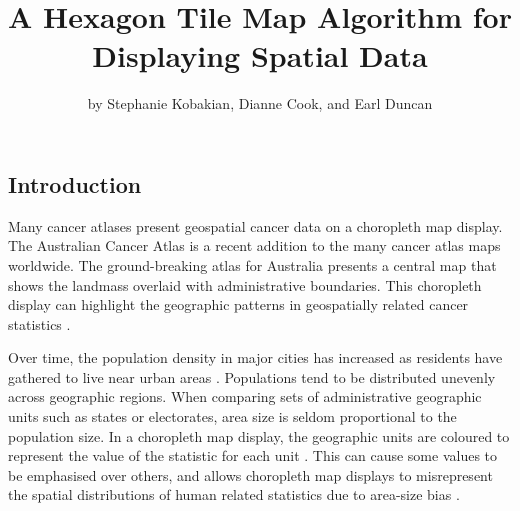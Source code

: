 \title{A Hexagon Tile Map Algorithm for Displaying Spatial Data}
\author{by Stephanie Kobakian, Dianne Cook, and Earl Duncan}

\maketitle


\hypertarget{introduction}{%
\subsection{Introduction}\label{introduction}}

Many cancer atlases present geospatial cancer data on a choropleth map
display. The Australian Cancer Atlas \citep{TACA} is a recent addition
to the many cancer atlas maps worldwide. The ground-breaking atlas for
Australia presents a central map that shows the landmass overlaid with
administrative boundaries. This choropleth display can highlight the
geographic patterns in geospatially related cancer statistics
\citep{SAMGIS}.

Over time, the population density in major cities has increased as
residents have gathered to live near urban areas \citep{ACTUC}.
Populations tend to be distributed unevenly across geographic regions.
When comparing sets of administrative geographic units such as states or
electorates, area size is seldom proportional to the population size. In
a choropleth map display, the geographic units are coloured to represent
the value of the statistic for each unit \citep{EI}. This can cause some
values to be emphasised over others, and allows choropleth map displays
to misrepresent the spatial distributions of human related statistics
due to area-size bias \citep{BCM}.

